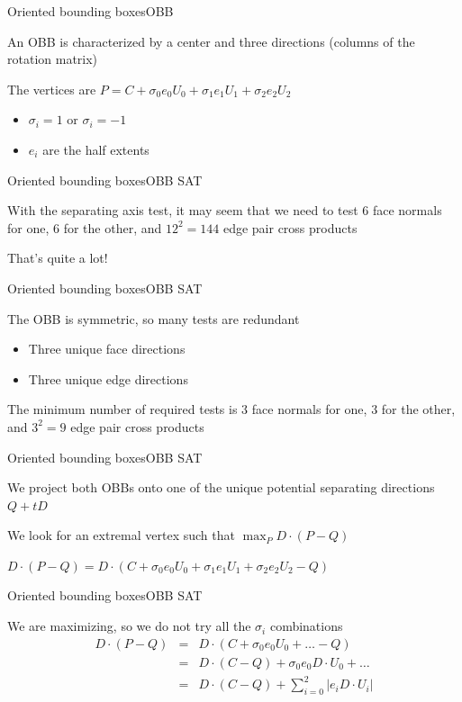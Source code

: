 \documentclass{beamer}
\begin{document}
\begin{slide}{Oriented bounding boxes}{OBB}{
\item An OBB is characterized by a center and three directions (columns of the rotation matrix)
\item The vertices are $P = C + \sigma_0 e_0 U_0 + \sigma_1 e_1 U_1 + \sigma_2 e_2 U_2$
\begin{itemize}
\item $\sigma_i = 1$ or $\sigma_i = -1$
\item $e_i$ are the half extents
\end{itemize}
}\end{slide}

\begin{slide}{Oriented bounding boxes}{OBB SAT}{
\item With the separating axis test, it may seem that we need to test $6$ face normals for one, $6$ for the other, and $12^2 = 144$ edge pair cross products
\item That's quite a lot!
}\end{slide}

\begin{slide}{Oriented bounding boxes}{OBB SAT}{
\item The OBB is symmetric, so many tests are redundant
\begin{itemize}
\item Three unique face directions
\item Three unique edge directions
\end{itemize}
\item The minimum number of required tests is $3$ face normals for one, $3$ for the other, and $3^2 = 9$ edge pair cross products
}\end{slide}

\begin{slide}{Oriented bounding boxes}{OBB SAT}{
\item We project both OBBs onto one of the unique potential separating directions $Q + tD$
\item We look for an extremal vertex such that $\max_P D \cdot (P - Q)$
\item $D \cdot (P - Q) = D \cdot (C + \sigma_0 e_0 U_0 + \sigma_1 e_1 U_1 + \sigma_2 e_2 U_2 - Q)$
}\end{slide}

\begin{slide}{Oriented bounding boxes}{OBB SAT}{
\item We are maximizing, so we do not try all the $\sigma_i$ combinations
\begin{eqnarray}
D \cdot (P - Q) &=& D \cdot (C + \sigma_0 e_0 U_0 + \dots  - Q) \\
&=& D \cdot (C - Q) + \sigma_0 e_0 D \cdot U_0 + \dots \\
&=& D \cdot (C - Q) + \sum_{i=0}^2 |e_i D \cdot U_i|
\end{eqnarray}
}\end{slide}
\end{document}
